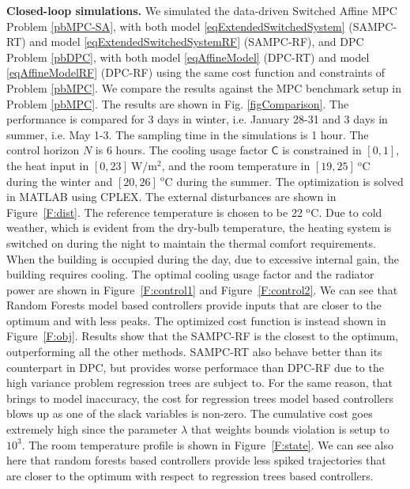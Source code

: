 \documentclass[]{ifacconf}  %
\begin{document}
\textbf{Closed-loop simulations.} We simulated the data-driven Switched Affine MPC Problem \ref{pbMPC-SA}, with both model \eqref{eqExtendedSwitchedSystem} (SAMPC-RT) and model \eqref{eqExtendedSwitchedSystemRF} (SAMPC-RF), and DPC Problem \ref{pbDPC}, with both model \eqref{eqAffineModel} (DPC-RT) and model \eqref{eqAffineModelRF} (DPC-RF) using the same cost function and constraints of Problem \ref{pbMPC}. 
We compare the results against the MPC benchmark setup in Problem \ref{pbMPC}.
The results are shown in Fig. \ref{figComparison}. 
The performance is compared for 3 days in winter, i.e. January 28-31 and 3 days in summer, i.e. May 1-3.
The sampling time in the simulations is 1 hour. The control horizon $N$ is 6 hours.
The cooling usage factor $\mathsf{C}$ is constrained in $[0,1]$, the heat input in $[0,23]\ \mathrm{W/m^2}$, and the room temperature in $[19,25]\ \mathrm{^oC}$ during the winter and $[20,26]\ \mathrm{^oC}$ during the summer.
The optimization is solved in MATLAB using CPLEX.
The external disturbances are shown in Figure~\ref{F:dist}.
The reference temperature is chosen to be 22 $\mathrm{^oC}$.
Due to cold weather, which is evident from the dry-bulb temperature, the heating system is switched on during the night to maintain the thermal comfort requirements. When the building is occupied during the day, due to excessive internal gain, the building requires cooling.
The optimal cooling usage factor and the radiator power are shown in Figure~\ref{F:control1} and Figure~\ref{F:control2}.
We can see that Random Forests model based controllers provide inputs that are closer to the optimum and with less peaks.
The optimized cost function is instead shown in Figure~\ref{F:obj}. Results show that the SAMPC-RF is the closest to the optimum, outperforming all the other methods. SAMPC-RT also behave better than its counterpart in DPC, but provides worse performace than DPC-RF due to the high variance problem regression trees are subject to.
For the same reason, that brings to model inaccuracy, the cost for regression trees model based controllers blows up as one of the slack variables is non-zero. The cumulative cost goes extremely high since the parameter $\lambda$ that weights bounds violation is setup to $10^3$.
The room temperature profile is shown in Figure~\ref{F:state}. We can see also here that random forests based controllers provide less spiked trajectories that are closer to the optimum with respect to regression trees based controllers.
\end{document}
